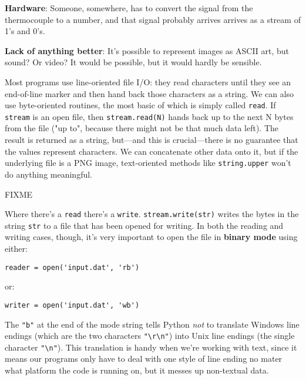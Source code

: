 \documentclass{scrbook}
\newcommand{\glossref}[1]{\textbf{#1}}
\begin{document}
\noindent \textbf{Hardware}: 
Someone, somewhere, has to convert the signal from the thermocouple to a number,
and that signal probably arrives arrives as a stream of 1's and 0's.


\noindent \textbf{Lack of anything better}: 
It's possible to represent images as ASCII art, but sound?
Or video?
It would be possible, but it would hardly be sensible.




Most programs use line-oriented file I/O:
they read characters until they see an end-of-line marker
and then hand back those characters as a string.
We can also use byte-oriented routines,
the most basic of which is simply called \texttt{read}.
If \texttt{stream} is an open file,
then \texttt{stream.read(N)} hands back up to the next N bytes from the file
("up to", because there might not be that much data left).
The result is returned as a string,
but—and this is crucial—there is no guarantee that the values represent characters.
We can concatenate other data onto it,
but if the underlying file is a PNG image,
text-oriented methods like \texttt{string.upper}
won't do anything meaningful.


FIXME


Where there's a \texttt{read} there's a \texttt{write}.
\texttt{stream.write(str)} writes the bytes in the string \texttt{str} to a file that has been opened for writing.
In both the reading and writing cases,
though,
it's very important to open the file in \glossref{binary mode} using either:

\begin{lstlisting}[frame=single,frameround=tttt]
reader = open('input.dat', 'rb')
\end{lstlisting}


\noindent or:

\begin{lstlisting}[frame=single,frameround=tttt]
writer = open('input.dat', 'wb')
\end{lstlisting}


The \texttt{"b"} at the end of the mode string tells Python
\emph{not} to translate Windows line endings (which are the two characters \texttt{"{\textbackslash}r{\textbackslash}n"})
into Unix line endings (the single character \texttt{"{\textbackslash}n"}).
This translation is handy when we're working with text,
since it means our programs only have to deal with one style of line
ending no mater what platform the code is running on,
but it messes up non-textual data.
\end{document}
